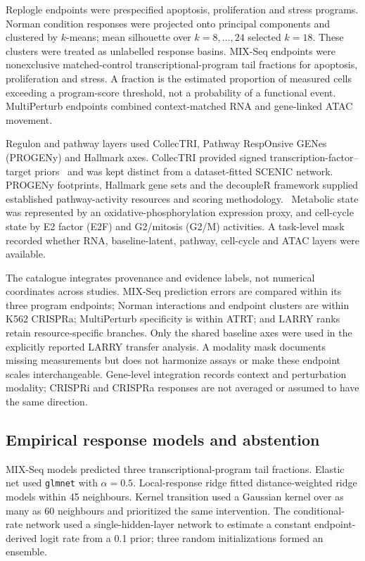 \documentclass[a4paper,fleqn]{cas-sc}
\makeatletter
\DeclareRobustCommand{\rev}[1]{{\color{red}\def\@citecolor{black}\def\@linkcolor{red}\def\@urlcolor{red}#1}}
\let\unmarkedcite\cite
\renewcommand{\cite}[1]{{\color{black}\def\@citecolor{black}\unmarkedcite{#1}}}
\makeatother
\begin{document}
Replogle endpoints were prespecified apoptosis, proliferation and stress programs. Norman condition responses were projected onto principal components and clustered by $k$-means; mean silhouette over $k=8,\ldots,24$ selected $k=18$. These clusters were treated as unlabelled response basins. \rev{MIX-Seq endpoints were nonexclusive matched-control transcriptional-program tail fractions for apoptosis, proliferation and stress.} \rev{A fraction is the estimated proportion of measured cells exceeding a program-score threshold, not a probability of a functional event.} MultiPerturb endpoints combined context-matched RNA and gene-linked ATAC movement.

Regulon and pathway layers used CollecTRI, Pathway RespOnsive GENes (PROGENy) and Hallmark axes. CollecTRI provided signed transcription-factor--target priors~\cite{collectri2023} and was kept distinct from a dataset-fitted SCENIC network.~\cite{scenic2017} PROGENy footprints, Hallmark gene sets and the decoupleR framework supplied established pathway-activity resources and scoring methodology.~\cite{schubert2018,liberzon2015,badia2022} Metabolic state was represented by an oxidative-phosphorylation expression proxy, and cell-cycle state by E2 factor (E2F) and G2/mitosis (G2/M) activities. A task-level mask recorded whether RNA, baseline-latent, pathway, cell-cycle and ATAC layers were available.

The catalogue integrates provenance and evidence labels, not numerical coordinates across studies. \rev{MIX-Seq prediction errors are compared within its three program endpoints; Norman interactions and endpoint clusters are within K562 CRISPRa; MultiPerturb specificity is within ATRT; and LARRY ranks retain resource-specific branches.} Only the shared baseline axes were used in the explicitly reported LARRY transfer analysis. A modality mask documents missing measurements but does not harmonize assays or make these endpoint scales interchangeable. Gene-level integration records context and perturbation modality; CRISPRi and CRISPRa responses are not averaged or assumed to have the same direction.

\subsection*{Empirical response models and abstention}

\rev{MIX-Seq models predicted three transcriptional-program tail fractions.} Elastic net used \texttt{glmnet} with $\alpha=0.5$. Local-response ridge fitted distance-weighted ridge models within 45 neighbours. Kernel transition used a Gaussian kernel over as many as 60 neighbours and prioritized the same intervention. The conditional-rate network used a single-hidden-layer network to estimate a constant endpoint-derived logit rate from a 0.1 prior; three random initializations formed an ensemble.
\end{document}

